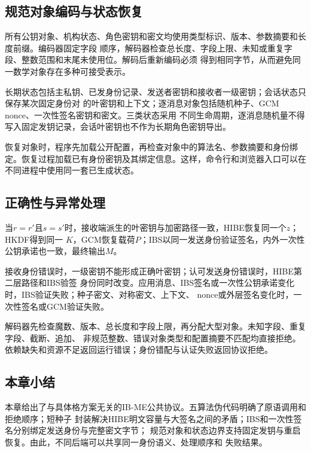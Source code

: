 \subsection{规范对象编码与状态恢复}

所有公钥对象、机构状态、角色密钥和密文均使用类型标识、版本、参数摘要和长度前缀。编码器固定字段
顺序，解码器检查总长度、字段上限、未知或重复字段、整数范围和末尾未使用位。解码后重新编码必须
得到相同字节，从而避免同一数学对象存在多种可接受表示。

长期状态包括主私钥、已发身份记录、发送者密钥和接收者一级密钥；会话状态只保存某次固定身份对
的叶密钥和上下文；逐消息对象包括随机种子、GCM nonce、一次性签名密钥和密文。三类状态采用
不同生命周期，逐消息随机量不得写入固定发钥记录，会话叶密钥也不作为长期角色密钥导出。

恢复对象时，程序先加载公开配置，再检查对象中的算法名、参数摘要和身份绑定。恢复过程加载已有身份密钥及其绑定信息。这样，命令行和浏览器入口可以在不同进程中使用同一套已生成状态。

\subsection{正确性与异常处理}

当$r=r'$且$s=s'$时，接收端派生的叶密钥与加密路径一致，HIBE恢复同一个$z$；HKDF得到同一
$K$，GCM恢复载荷$P$；IBS以同一发送身份验证签名，内外一次性公钥承诺也一致，最终输出$M$。

接收身份错误时，一级密钥不能形成正确叶密钥；认可发送身份错误时，HIBE第二层路径和IBS验签
身份同时改变。应用消息、IBS签名或一次性公钥承诺变化时，IBS验证失败；种子密文、对称密文、上下文、
nonce或外层签名变化时，一次性签名或GCM验证失败。

解码器先检查魔数、版本、总长度和字段上限，再分配大型对象。未知字段、重复字段、截断、追加、
非规范整数、错误对象类型和配置摘要不匹配均直接拒绝。依赖缺失和资源不足返回运行错误；身份错配与认证失败返回协议拒绝。

\subsection{本章小结}

本章给出了与具体格方案无关的IB-ME公共协议。五算法伪代码明确了原语调用和拒绝顺序；短种子
封装解决HIBE明文容量与大签名之间的矛盾；IBS和一次性签名分别绑定发送身份与完整密文字节；
规范对象和状态边界支持固定发钥与重启恢复。由此，不同后端可以共享同一身份语义、处理顺序和
失败结果。
